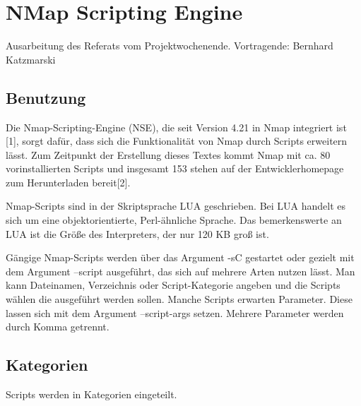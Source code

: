 \section{NMap Scripting Engine}
\label{sec:comp:nse}

Ausarbeitung des Referats vom Projektwochenende. Vortragende: Bernhard
Katzmarski

\subsection{Benutzung} Die Nmap-Scripting-Engine (NSE), die seit
Version 4.21 in Nmap integriert ist [1], sorgt dafür, dass sich die
Funktionalität von Nmap durch Scripts erweitern lässt. Zum Zeitpunkt
der Erstellung dieses Textes kommt Nmap mit ca. 80 vorinstallierten
Scripts und insgesamt 153 stehen auf der Entwicklerhomepage zum
Herunterladen bereit[2].

Nmap-Scripts sind in der Skriptsprache LUA geschrieben. Bei LUA
handelt es sich um eine objektorientierte, Perl-ähnliche Sprache.  Das
bemerkenswerte an LUA ist die Größe des Interpreters, der nur 120 KB
groß ist.

Gängige Nmap-Scripts werden über das Argument -sC gestartet oder
gezielt mit dem Argument --script ausgeführt, das sich auf mehrere
Arten nutzen lässt. Man kann Dateinamen, Verzeichnis oder
Script-Kategorie angeben und die Scripts wählen die ausgeführt werden
sollen. Manche Scripts erwarten Parameter. Diese lassen sich mit dem
Argument --script-args setzen. Mehrere Parameter werden durch Komma
getrennt.

\subsection{Kategorien}

Scripts werden in Kategorien eingeteilt.

